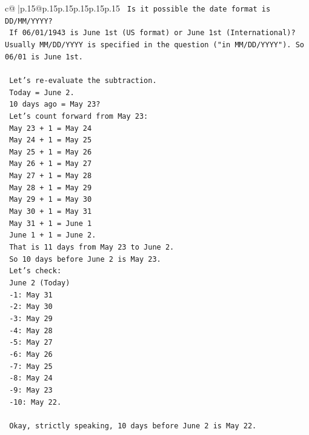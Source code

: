 \documentclass{article}
\begin{document}
{\begin{supertabular}{c@{$\;$}|p{.15\linewidth}@{}p{.15\linewidth}p{.15\linewidth}p{.15\linewidth}p{.15\linewidth}p{.15\linewidth}}
{{{\texttt{    Is it possible the date format is DD/MM/YYYY?} \\
\texttt{    If 06/01/1943 is June 1st (US format) or June 1st (International)? Usually MM/DD/YYYY is specified in the question ("in MM/DD/YYYY"). So 06/01 is June 1st.} \\
\\ 
\texttt{    Let's re{-}evaluate the subtraction.} \\
\texttt{    Today = June 2.} \\
\texttt{    10 days ago = May 23?} \\
\texttt{    Let's count forward from May 23:} \\
\texttt{    May 23 + 1 = May 24} \\
\texttt{    May 24 + 1 = May 25} \\
\texttt{    May 25 + 1 = May 26} \\
\texttt{    May 26 + 1 = May 27} \\
\texttt{    May 27 + 1 = May 28} \\
\texttt{    May 28 + 1 = May 29} \\
\texttt{    May 29 + 1 = May 30} \\
\texttt{    May 30 + 1 = May 31} \\
\texttt{    May 31 + 1 = June 1} \\
\texttt{    June 1 + 1 = June 2.} \\
\texttt{    That is 11 days from May 23 to June 2.} \\
\texttt{    So 10 days before June 2 is May 23.} \\
\texttt{    Let's check:} \\
\texttt{    June 2 (Today)} \\
\texttt{    {-}1: May 31} \\
\texttt{    {-}2: May 30} \\
\texttt{    {-}3: May 29} \\
\texttt{    {-}4: May 28} \\
\texttt{    {-}5: May 27} \\
\texttt{    {-}6: May 26} \\
\texttt{    {-}7: May 25} \\
\texttt{    {-}8: May 24} \\
\texttt{    {-}9: May 23} \\
\texttt{    {-}10: May 22.} \\
\\ 
\texttt{    Okay, strictly speaking, 10 days before June 2 is May 22.} \\
}}}
\end{supertabular}}
\end{document}
